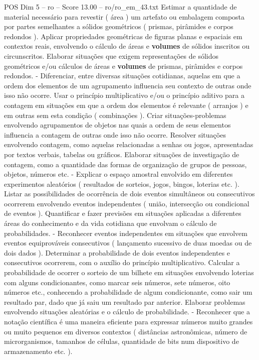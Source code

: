 \begin{textsample}{POS Dim 5 – ro – Score 13.00 – ro/ro\_em\_43.txt}
Estimar a quantidade de material necessário para revestir ( área ) um artefato ou embalagem composta por partes semelhantes a sólidos geométricos ( prismas, pirâmides e corpos redondos ).
Aplicar propriedades geométricas de figuras planas e espaciais em contextos reais, envolvendo o cálculo de áreas e \textbf{volumes} de sólidos inscritos ou circunscritos.
Elaborar situações que exigem representações de sólidos geométricos e/ou cálculos de áreas e \textbf{volumes} de prismas, pirâmides e corpos redondos. - Diferenciar, entre diversas situações cotidianas, aquelas em que a ordem dos elementos de um agrupamento influencia seu contexto de outras onde isso não ocorre.
Usar o princípio multiplicativo e/ou o princípio aditivo para a contagem em situações em que a ordem dos elementos é relevante ( arranjos ) e em outras sem esta condição ( combinações ).
Criar situações-problemas envolvendo agrupamentos de objetos nas quais a ordem de seus elementos influencia a contagem de outras onde isso não ocorre.
Resolver situações envolvendo contagem, como aquelas relacionadas a senhas ou jogos, apresentadas por textos verbais, tabelas ou gráficos.
Elaborar situações de investigação de contagem, como a quantidade das formas de organização de grupos de pessoas, objetos, números etc. - Explicar o espaço amostral envolvido em diferentes experimentos aleatórios ( resultados de sorteios, jogos, bingos, loterias etc. ).
Listar as possibilidades de ocorrência de dois eventos simultâneos ou consecutivos ocorrerem envolvendo eventos independentes ( união, intersecção ou condicional de eventos ).
Quantificar e fazer previsões em situações aplicadas a diferentes áreas do conhecimento e da vida cotidiana que envolvam o cálculo de probabilidades. - Reconhecer eventos independentes em situações que envolvem eventos equiprováveis consecutivos ( lançamento sucessivo de duas moedas ou de dois dados ).
Determinar a probabilidade de dois eventos independentes e consecutivos ocorrerem, com o auxílio do princípio multiplicativo.
Calcular a probabilidade de ocorrer o sorteio de um bilhete em situações envolvendo loterias com alguns condicionantes, como marcar seis números, sete números, oito números etc., conhecendo a probabilidade de algum condicionante, como sair um resultado par, dado que já saiu um resultado par anterior.
Elaborar problemas envolvendo situações aleatórias e o cálculo de probabilidade. - Reconhecer que a notação científica é uma maneira eficiente para expressar números muito grandes ou muito pequenos em diversos contextos ( distâncias astronômicas, número de microrganismos, tamanhos de células, quantidade de bits num dispositivo de armazenamento etc. ).

\end{textsample}
